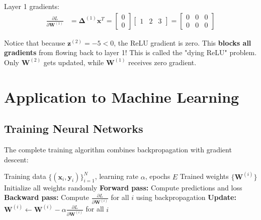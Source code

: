 \begin{notechapter}
Layer 1 gradients:
\begin{align*}
\frac{\partial L}{\partial \mathbf{W}^{(1)}} &= \boldsymbol{\Delta}^{(1)} \mathbf{x}^T = \begin{bmatrix} 0 \\ 0 \end{bmatrix} \begin{bmatrix} 1 & 2 & 3 \end{bmatrix} = \begin{bmatrix} 0 & 0 & 0 \\ 0 & 0 & 0 \end{bmatrix}
\end{align*}

\begin{tcolorbox}[colback=red!5,colframe=red!60,title=Dying ReLU Problem]
Notice that because $\mathbf{z}^{(2)} = -5 < 0$, the ReLU gradient is zero. This \textbf{blocks all gradients} from flowing back to layer 1! This is called the "dying ReLU" problem. Only $\mathbf{W}^{(2)}$ gets updated, while $\mathbf{W}^{(1)}$ receives zero gradient.
\end{tcolorbox}

\section{Application to Machine Learning}

\subsection{Training Neural Networks}

The complete training algorithm combines backpropagation with gradient descent:

\begin{algorithm}[H]
\caption{Stochastic Gradient Descent with Backpropagation}
\begin{algorithmic}[1]
\Require Training data $\{(\mathbf{x}_i, \mathbf{y}_i)\}_{i=1}^N$, learning rate $\alpha$, epochs $E$
\Ensure Trained weights $\{\mathbf{W}^{(i)}\}$
\State Initialize all weights randomly
        \State \textbf{Forward pass:} Compute predictions and loss
        \State \textbf{Backward pass:} Compute $\frac{\partial L}{\partial \mathbf{W}^{(i)}}$ for all $i$ using backpropagation
        \State \textbf{Update:} $\mathbf{W}^{(i)} \gets \mathbf{W}^{(i)} - \alpha \frac{\partial L}{\partial \mathbf{W}^{(i)}}$ for all $i$
    \EndFor
\EndFor
\end{algorithmic}
\end{algorithm}


\end{notechapter}
